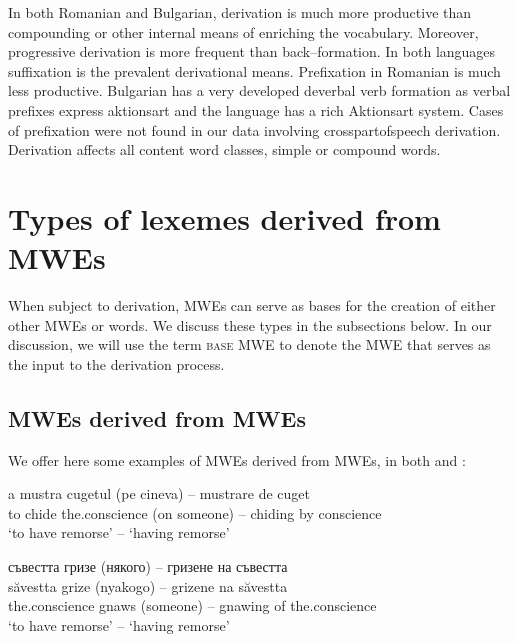 \documentclass[output=paper]{langsci/langscibook}
\begin{document}
In both Romanian and Bulgarian, derivation is much more productive than
compounding or other internal means of enriching the vocabulary.
Moreover, progressive derivation is more frequent than back–formation.
In both languages suffixation is the prevalent derivational means.
Prefixation in Romanian is much less productive. Bulgarian has a very
developed deverbal verb formation as verbal prefixes express
aktionsart and the language has a rich Aktionsart system. Cases of
prefixation were not found in our data involving cross\textendash part\textendash of\textendash speech
derivation. Derivation affects all content word classes, simple or
compound words.


\section{Types of lexemes derived from MWEs}


When subject to derivation, MWEs can serve as bases for the creation of
either other MWEs or words. We discuss these types in the subsections
below. In our discussion, we will use the term \textsc{base MWE} to denote the
MWE that serves as the input to the derivation process. 

\subsection{MWEs derived from MWEs}
\label{mwesfrommwes}

We offer here some examples of MWEs derived from MWEs, in both 
and :


\begin{exe} 
\ex \label{ex:8:2}
\settowidth{}
\gll a mustra cugetul (pe cineva) -- mustrare de cuget\\ 
to chide  the.conscience  (on someone) -- chiding by conscience \\ 
\glt ‘to have remorse’ -- ‘having remorse’
\end{exe}

\begin{exe}
\ex \label{ex:8:3}
\settowidth{}
\glll съвестта гризе \textnormal{(}някого\textnormal{)} -- гризене на съвестта\\
săvestta grize (nyakogo) -- grizene na săvestta\\
the.conscience  gnaws (someone) --  gnawing of 
the.conscience\\ 
\glt ‘to have remorse’ -- ‘having remorse’
\end{exe}
\end{document}
